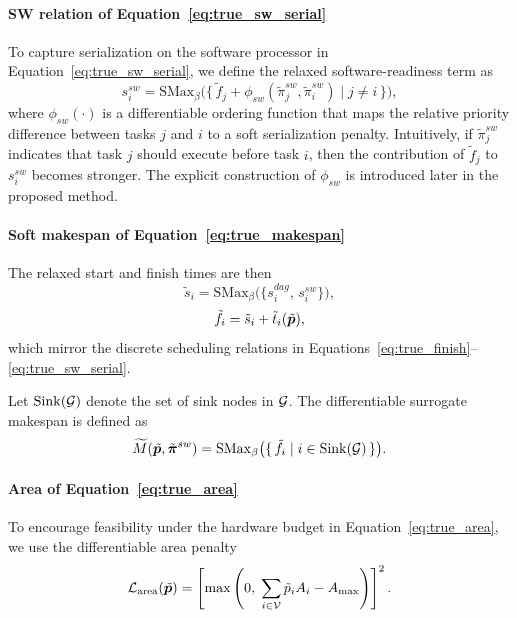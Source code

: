 \paragraph{\textbf{SW relation of Equation~\eqref{eq:true_sw_serial}}}
To capture serialization on the software processor in Equation~\eqref{eq:true_sw_serial}, we define the relaxed software-readiness term as
\begin{equation}
s_i^{sw}
=
\mathrm{SMax}_{\beta}
\Big(
\{\, \tilde{f}_j + \phi_{sw}(\tilde{\pi}_j^{sw}, \tilde{\pi}_i^{sw}) \mid j \neq i\,\}
\Big),
\label{eq:soft_rsw}
\end{equation}
where $\phi_{sw}(\cdot)$ is a differentiable ordering function that maps the relative priority difference between tasks $j$ and $i$ to a soft serialization penalty. Intuitively, if $\tilde{\pi}_j^{sw}$ indicates that task $j$ should execute before task $i$, then the contribution of $\tilde{f}_j$ to $s_i^{sw}$ becomes stronger. The explicit construction of $\phi_{sw}$ is introduced later in the proposed method.

\paragraph{\textbf{Soft makespan of Equation~\eqref{eq:true_makespan}}}
The relaxed start and finish times are then
\begin{equation}
\tilde{s}_i
=
\mathrm{SMax}_{\beta}\big(\{s_i^{dag},\, s_i^{sw}\}\big),
\label{eq:soft_start}
\end{equation}
\begin{equation}
\tilde{f}_i
=
\tilde{s}_i + \tilde{t}_i(\tilde{{\bm{p}}}),
\label{eq:soft_finish}
\end{equation}
which mirror the discrete scheduling relations in Equations~\eqref{eq:true_finish}--\eqref{eq:true_sw_serial}.

Let $\operatorname{Sink}({\mathcal{G}})$ denote the set of sink nodes in ${\mathcal{G}}$. The differentiable surrogate makespan is defined as
\begin{equation}
\widetilde{M}(\tilde{{\bm{p}}},\tilde{\bm{\pi}}^{sw})
=
\mathrm{SMax}_{\beta}\big(\{\, \tilde{f}_i \mid i \in \operatorname{Sink}({\mathcal{G}})\,\}\big).
\label{eq:soft_makespan_symbol}
\end{equation}

\paragraph{\textbf{Area of Equation~\eqref{eq:true_area}}}
To encourage feasibility under the hardware budget in Equation~\eqref{eq:true_area}, we use the differentiable area penalty
\begin{equation}
\mathcal{L}_{\mathrm{area}}(\tilde{{\bm{p}}})
=
\left[
\max\left(
0,\;
\sum_{i\in{\mathcal{V}}}\tilde{p}_i A_i - A_{\max}
\right)
\right]^2.
\label{eq:l_area}
\end{equation}

